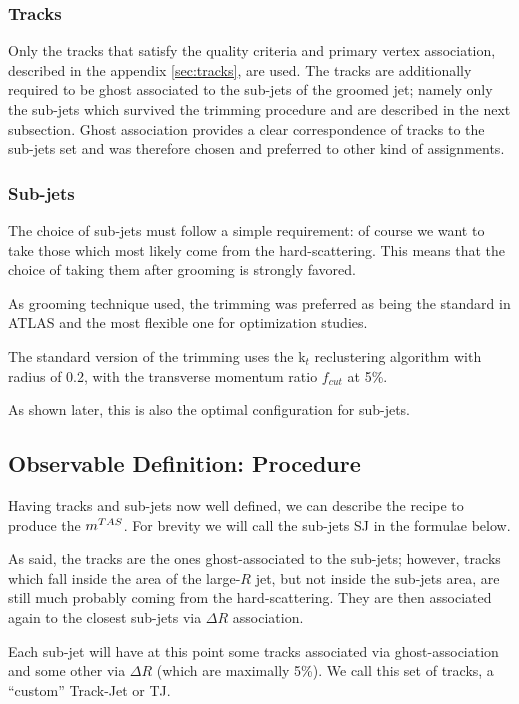 \subsubsection{Tracks}
Only the tracks that satisfy the quality criteria and primary vertex association, described in the appendix \ref{sec:tracks}, are used.
The tracks are additionally required to be ghost associated to the sub-jets of the groomed jet; namely only the sub-jets which survived the trimming procedure and are described in the next subsection.
Ghost association provides a clear correspondence of tracks to the sub-jets set and was therefore chosen and preferred to other kind of assignments.

\subsubsection{Sub-jets}

The choice of sub-jets must follow a simple requirement: of course we want to take those which most likely come from the hard-scattering. This means that the choice of taking them after grooming is strongly favored.

As grooming technique used, the trimming was preferred as being the standard in ATLAS and the most flexible one for optimization studies.

The standard version of the trimming uses the k$_t$ reclustering algorithm with radius of 0.2, with the transverse momentum ratio $f_{cut}$ at 5\%.

As shown later, this is also the optimal configuration for sub-jets.

\subsection{Observable Definition: Procedure}
Having tracks and sub-jets now well defined, we can describe the recipe to produce the $m^{TAS}$. For brevity we will call the sub-jets SJ in the formulae below. 

As said, the tracks are the ones ghost-associated to the sub-jets; however, tracks which fall inside the area of the large-$R$ jet, but not inside the sub-jets area, are still much probably coming from the hard-scattering. They are then associated again to the closest sub-jets via $\Delta R$ association.

Each sub-jet will have at this point some tracks associated via ghost-association and some other via $\Delta R$ (which are maximally 5\%). We call this set of tracks, a ``custom'' Track-Jet or TJ.

